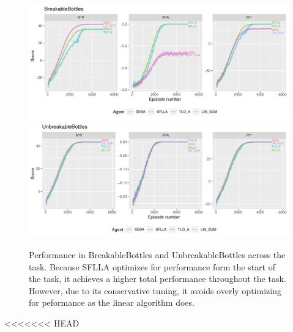 \begin{figure}

  \includegraphics[width=\columnwidth]{output/multirun_n100_eeba_rolf_default_scale_progress_BreakableBottles.pdf}
  \includegraphics[width=\columnwidth]{output/multirun_n100_eeba_rolf_default_scale_progress_UnbreakableBottles.pdf}
  \caption{Performance in BreakableBottles and UnbreakableBottles across the task. Because SFLLA optimizes for performance form the start of the task, it achieves a higher total performance throughout the task. However, due to its conservative tuning, it avoids overly optimizing for peformance as the linear algorithm does.
  }
   \label{fig:bb_performance}
 \end{figure}



<<<<<<< HEAD
 
